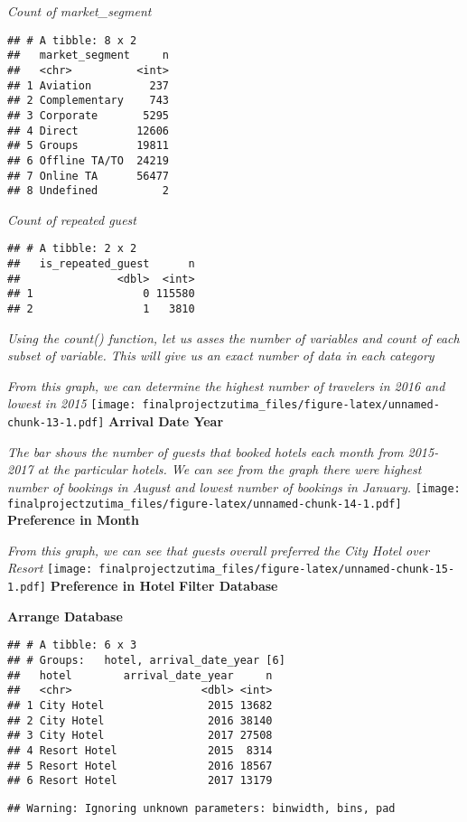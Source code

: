 \documentclass[
]{article}
\begin{document}
\emph{Count of market\_segment}

\begin{verbatim}
## # A tibble: 8 x 2
##   market_segment     n
##   <chr>          <int>
## 1 Aviation         237
## 2 Complementary    743
## 3 Corporate       5295
## 4 Direct         12606
## 5 Groups         19811
## 6 Offline TA/TO  24219
## 7 Online TA      56477
## 8 Undefined          2
\end{verbatim}

\emph{Count of repeated guest}

\begin{verbatim}
## # A tibble: 2 x 2
##   is_repeated_guest      n
##               <dbl>  <int>
## 1                 0 115580
## 2                 1   3810
\end{verbatim}

\emph{Using the count() function, let us asses the number of variables
and count of each subset of variable. This will give us an exact number
of data in each category}

\emph{From this graph, we can determine the highest number of travelers
in 2016 and lowest in 2015}
\texttt{[image: finalprojectzutima\_files/figure-latex/unnamed-chunk-13-1.pdf]}
\textbf{Arrival Date Year}

\emph{The bar shows the number of guests that booked hotels each month
from 2015-2017 at the particular hotels. We can see from the graph there
were highest number of bookings in August and lowest number of bookings
in January.}
\texttt{[image: finalprojectzutima\_files/figure-latex/unnamed-chunk-14-1.pdf]}
\textbf{Preference in Month}

\emph{From this graph, we can see that guests overall preferred the City
Hotel over Resort}
\texttt{[image: finalprojectzutima\_files/figure-latex/unnamed-chunk-15-1.pdf]}
\textbf{Preference in Hotel} \textbf{Filter Database}

\textbf{Arrange Database}

\begin{verbatim}
## # A tibble: 6 x 3
## # Groups:   hotel, arrival_date_year [6]
##   hotel        arrival_date_year     n
##   <chr>                    <dbl> <int>
## 1 City Hotel                2015 13682
## 2 City Hotel                2016 38140
## 3 City Hotel                2017 27508
## 4 Resort Hotel              2015  8314
## 5 Resort Hotel              2016 18567
## 6 Resort Hotel              2017 13179
\end{verbatim}

\begin{verbatim}
## Warning: Ignoring unknown parameters: binwidth, bins, pad
\end{verbatim}
\end{document}
